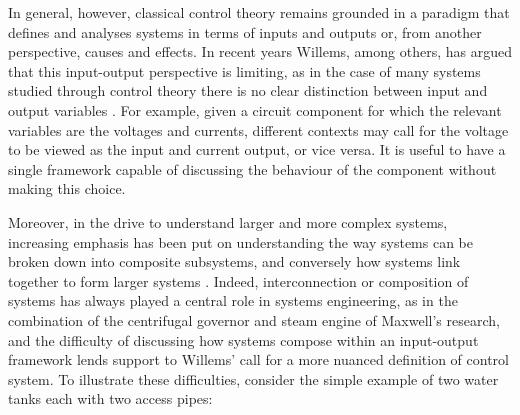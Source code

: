 In general, however, classical control theory remains grounded in a paradigm that defines and analyses systems in terms of inputs and outputs or, from another perspective, causes and effects. In recent years Willems, among others, has argued that this input-output perspective is limiting, as in the case of many systems studied through control theory there is no clear distinction between input and output variables \cite{Wi}. For example, given a circuit component for which the relevant variables are the voltages and currents, different contexts may call for the voltage to be viewed as the input and current output, or vice versa. It is useful to have a single framework capable of discussing the behaviour of the component without making this choice.

Moreover, in the drive to understand larger and more complex systems, increasing emphasis has been put on understanding the way systems can be broken down into composite subsystems, and conversely how systems link together to form larger systems \cite{Wi2, KT}. Indeed, interconnection or composition of systems has always played a central role in systems engineering, as in the combination of the centrifugal governor and steam engine of Maxwell's research, and the difficulty of discussing how systems compose within an input-output framework lends support to Willems' call for a more nuanced definition of control system. To illustrate these difficulties, consider the simple example of two water tanks each with two access pipes:
